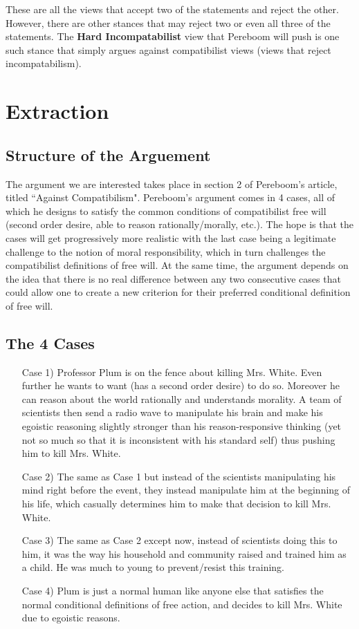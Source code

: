 \documentclass{article}
\begin{document}
These are all the views that accept two of the statements and reject the other. However, there are other stances that may reject two or even all three of the statements. The \textbf{Hard Incompatabilist} view that Pereboom will push is one such stance that simply argues against compatibilist views (views that reject incompatabilism).

\section{Extraction}
\subsection{Structure of the Arguement}
The argument we are interested takes place in section 2 of Pereboom's article, titled ``Against Compatibilism". Pereboom's argument comes in 4 cases, all of which he designs to satisfy the common conditions of compatibilist free will (second order desire, able to reason rationally/morally, etc.). The hope is that the cases will get progressively more realistic with the last case being a legitimate challenge to the notion of moral responsibility, which in turn challenges the compatibilist definitions of free will. At the same time, the argument depends on the idea that there is no real difference between any two consecutive cases that could allow one to create a new criterion for their preferred conditional definition of free will.

\subsection{The 4 Cases}
\begin{enumerate}
    \item[Case 1)] Professor Plum is on the fence about killing Mrs. White. Even further he wants to want (has a second order desire) to do so. Moreover he can reason about the world rationally and understands morality. A team of scientists then send a radio wave to manipulate his brain and make his egoistic reasoning slightly stronger than his reason-responsive thinking (yet not so much so that it is inconsistent with his standard self) thus pushing him to kill Mrs. White.
    \item[Case 2)] The same as Case 1 but instead of the scientists manipulating his mind right before the event, they instead manipulate him  at the beginning of his life, which casually determines him to make that decision to kill Mrs. White.
    \item[Case 3)] The same as Case 2 except now, instead of scientists doing this to him, it was the way his household and community raised and trained him as a child. He was much to young to prevent/resist this training.
    \item[Case 4)] Plum is just a normal human like anyone else that satisfies the normal conditional definitions of free action, and decides to kill Mrs. White due to egoistic reasons.
\end{enumerate}
\end{document}
